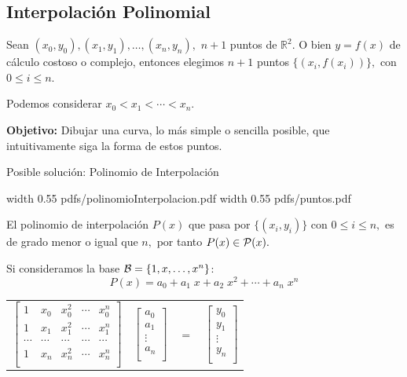 \documentclass[twoside]{report}
\newcommand{\colocapdf}[2]{\quad\pdfimage width #2 {pdfs/#1.pdf}}
\begin{document}
\subsection{Interpolación Polinomial}

Sean $(x_0,y_0), (x_1,y_1),\ldots,(x_n,y_n),$ $n+1$ puntos de $\mathbb{R}^2.$ O bien $y=f(x)$ de cálculo costoso o complejo, entonces elegimos $n+1$ puntos $\{(x_i,f(x_i))\},$ con $0\leq i\leq n.$

Podemos considerar $x_0<x_1<\cdots <x_n$.

{\bf Objetivo:} Dibujar una curva, lo más simple o sencilla posible, que intuitivamente siga la forma de  estos puntos.

Posible solución: Polinomio de Interpolación

%
%
%
%

\begin{center}
\colocapdf{polinomioInterpolacion}{0.55\textwidth}
\colocapdf{puntos}{0.55\textwidth}
\end{center}

El polinomio de interpolación $P(x)$ que pasa por $\{(x_i,y_i)\}$ con $0\leq i \leq n,$ es de grado menor o igual que $n,$ por tanto $P(x)\in {\cal P}(x).$

Si consideramos la base ${\cal B}=\{1,x,\ldots,x^n\}$:
$$P(x)=a_0+a_1 \;x+a_2\; x^2+\cdots+a_n \;x^n$$

\begin{center}
\begin{tabular}{cccc} $\left[ \begin{array}{ccccc}
1&x_0&x_0^2&\cdots&x_0^n\\
1&x_1&x_1^2&\cdots&x_1^n\\
\cdots&\cdots&\cdots&\cdots&\cdots\\
1&x_n&x_n^2&\cdots&x_n^n\\
\end{array} \right]$ & $\left[ \begin{array}{c} a_0\\a_1\\ \vdots \\ a_n \\ \end{array} \right] $& $=$ &
$\left[ \begin{array}{c} y_0\\y_1\\ \vdots \\ y_n \\
\end{array}\right]$
\end{tabular}
\end{center}
\end{document}
